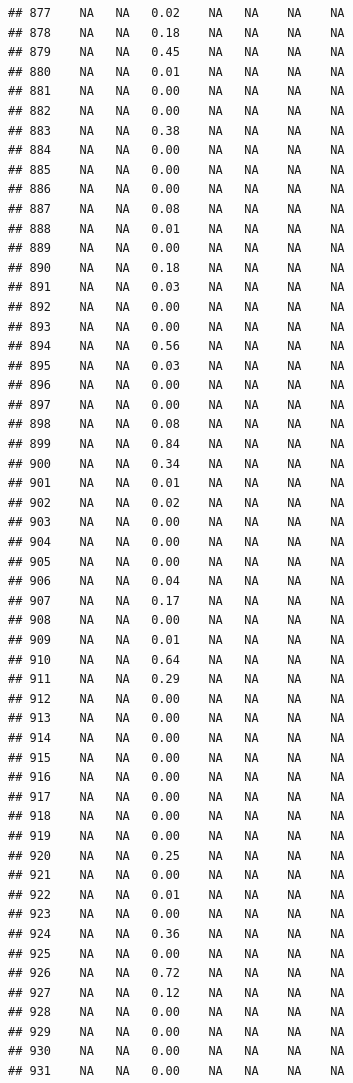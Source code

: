 \documentclass{article}\usepackage{graphicx, color}
\makeatletter
\newenvironment{kframe}{%
 \def\at@end@of@kframe{}%
 \ifinner\ifhmode%
  \def\at@end@of@kframe{\end{minipage}}%
  \begin{minipage}{\columnwidth}%
 \fi\fi%
 \def\FrameCommand##1{\hskip\@totalleftmargin \hskip-\fboxsep
 \colorbox{shadecolor}{##1}\hskip-\fboxsep
     \hskip-\linewidth \hskip-\@totalleftmargin \hskip\columnwidth}%
 \MakeFramed {\advance\hsize-\width
   \@totalleftmargin\z@ \linewidth\hsize
   \@setminipage}}%
 {\par\unskip\endMakeFramed%
 \at@end@of@kframe}
\newenvironment{knitrout}{}{} %
\makeatother
\begin{document}
\begin{knitrout}
\begin{kframe}
\begin{verbatim}
## 877    NA   NA   0.02    NA   NA    NA    NA
## 878    NA   NA   0.18    NA   NA    NA    NA
## 879    NA   NA   0.45    NA   NA    NA    NA
## 880    NA   NA   0.01    NA   NA    NA    NA
## 881    NA   NA   0.00    NA   NA    NA    NA
## 882    NA   NA   0.00    NA   NA    NA    NA
## 883    NA   NA   0.38    NA   NA    NA    NA
## 884    NA   NA   0.00    NA   NA    NA    NA
## 885    NA   NA   0.00    NA   NA    NA    NA
## 886    NA   NA   0.00    NA   NA    NA    NA
## 887    NA   NA   0.08    NA   NA    NA    NA
## 888    NA   NA   0.01    NA   NA    NA    NA
## 889    NA   NA   0.00    NA   NA    NA    NA
## 890    NA   NA   0.18    NA   NA    NA    NA
## 891    NA   NA   0.03    NA   NA    NA    NA
## 892    NA   NA   0.00    NA   NA    NA    NA
## 893    NA   NA   0.00    NA   NA    NA    NA
## 894    NA   NA   0.56    NA   NA    NA    NA
## 895    NA   NA   0.03    NA   NA    NA    NA
## 896    NA   NA   0.00    NA   NA    NA    NA
## 897    NA   NA   0.00    NA   NA    NA    NA
## 898    NA   NA   0.08    NA   NA    NA    NA
## 899    NA   NA   0.84    NA   NA    NA    NA
## 900    NA   NA   0.34    NA   NA    NA    NA
## 901    NA   NA   0.01    NA   NA    NA    NA
## 902    NA   NA   0.02    NA   NA    NA    NA
## 903    NA   NA   0.00    NA   NA    NA    NA
## 904    NA   NA   0.00    NA   NA    NA    NA
## 905    NA   NA   0.00    NA   NA    NA    NA
## 906    NA   NA   0.04    NA   NA    NA    NA
## 907    NA   NA   0.17    NA   NA    NA    NA
## 908    NA   NA   0.00    NA   NA    NA    NA
## 909    NA   NA   0.01    NA   NA    NA    NA
## 910    NA   NA   0.64    NA   NA    NA    NA
## 911    NA   NA   0.29    NA   NA    NA    NA
## 912    NA   NA   0.00    NA   NA    NA    NA
## 913    NA   NA   0.00    NA   NA    NA    NA
## 914    NA   NA   0.00    NA   NA    NA    NA
## 915    NA   NA   0.00    NA   NA    NA    NA
## 916    NA   NA   0.00    NA   NA    NA    NA
## 917    NA   NA   0.00    NA   NA    NA    NA
## 918    NA   NA   0.00    NA   NA    NA    NA
## 919    NA   NA   0.00    NA   NA    NA    NA
## 920    NA   NA   0.25    NA   NA    NA    NA
## 921    NA   NA   0.00    NA   NA    NA    NA
## 922    NA   NA   0.01    NA   NA    NA    NA
## 923    NA   NA   0.00    NA   NA    NA    NA
## 924    NA   NA   0.36    NA   NA    NA    NA
## 925    NA   NA   0.00    NA   NA    NA    NA
## 926    NA   NA   0.72    NA   NA    NA    NA
## 927    NA   NA   0.12    NA   NA    NA    NA
## 928    NA   NA   0.00    NA   NA    NA    NA
## 929    NA   NA   0.00    NA   NA    NA    NA
## 930    NA   NA   0.00    NA   NA    NA    NA
## 931    NA   NA   0.00    NA   NA    NA    NA

\end{verbatim}
\end{kframe}
\end{knitrout}
\end{document}
